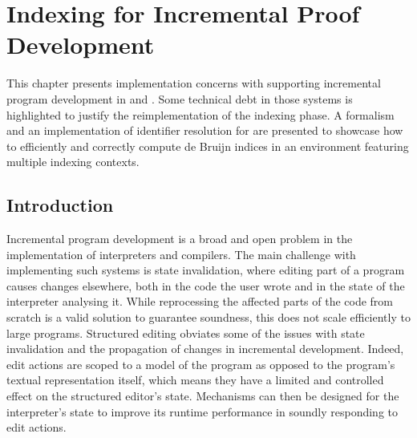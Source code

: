 \chapter{Indexing for Incremental Proof Development}\label{chapter:indexing-reimplementation}

This chapter presents implementation concerns with supporting incremental program development in \Beluga and \Harpoon.
Some technical debt in those systems is highlighted to justify the reimplementation of the indexing phase.
A formalism and an implementation of identifier resolution for \Beluga are presented to showcase how to efficiently and correctly compute de Bruijn indices in an environment featuring multiple indexing contexts.

\section{Introduction}


Incremental program development is a broad and open problem in the implementation of interpreters and compilers.
The main challenge with implementing such systems is state invalidation, where editing part of a program causes changes elsewhere, both in the code the user wrote and in the state of the interpreter analysing it.
While reprocessing the affected parts of the code from scratch is a valid solution to guarantee soundness, this does not scale efficiently to large programs.
Structured editing obviates some of the issues with state invalidation and the propagation of changes in incremental development.
Indeed, edit actions are scoped to a model of the program as opposed to the program's textual representation itself, which means they have a limited and controlled effect on the structured editor's state.
Mechanisms can then be designed for the interpreter's state to improve its runtime performance in soundly responding to edit actions.



